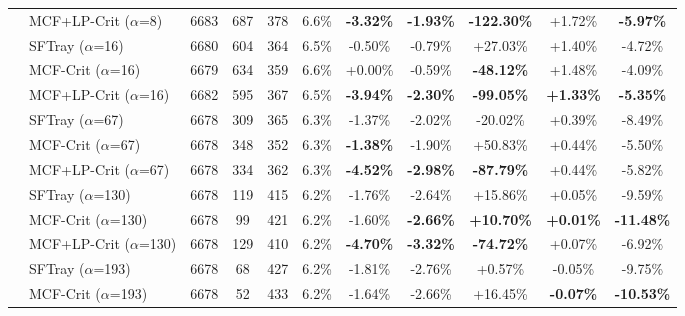 \begin{table}[t]
{\begin{tabular}{ll|cccc|ccc|cc}
 & MCF+LP-Crit ($\alpha$=8) & 6683 & 687 & 378 & 6.6\% & \textbf{-3.32\%} & \textbf{-1.93\%} & \textbf{-122.30\%} & +1.72\% & \textbf{-5.97\%} \\

\addlinespace[0.5em]

 & SFTray ($\alpha$=16) & 6680 & 604 & 364 & 6.5\% & -0.50\% & -0.79\% & +27.03\% & +1.40\% & -4.72\% \\

 & MCF-Crit ($\alpha$=16) & 6679 & 634 & 359 & 6.6\% & +0.00\% & -0.59\% & \textbf{-48.12\%} & +1.48\% & -4.09\% \\

 & MCF+LP-Crit ($\alpha$=16) & 6682 & 595 & 367 & 6.5\% & \textbf{-3.94\%} & \textbf{-2.30\%} & \textbf{-99.05\%} & \textbf{+1.33\%} & \textbf{-5.35\%} \\

\addlinespace[0.5em]

 & SFTray ($\alpha$=67) & 6678 & 309 & 365 & 6.3\% & -1.37\% & -2.02\% & -20.02\% & +0.39\% & -8.49\% \\

 & MCF-Crit ($\alpha$=67) & 6678 & 348 & 352 & 6.3\% & \textbf{-1.38\%} & -1.90\% & +50.83\% & +0.44\% & -5.50\% \\

 & MCF+LP-Crit ($\alpha$=67) & 6678 & 334 & 362 & 6.3\% & \textbf{-4.52\%} & \textbf{-2.98\%} & \textbf{-87.79\%} & +0.44\% & -5.82\% \\

\addlinespace[0.5em]

 & SFTray ($\alpha$=130) & 6678 & 119 & 415 & 6.2\% & -1.76\% & -2.64\% & +15.86\% & +0.05\% & -9.59\% \\

 & MCF-Crit ($\alpha$=130) & 6678 & 99 & 421 & 6.2\% & -1.60\% & \textbf{-2.66\%} & \textbf{+10.70\%} & \textbf{+0.01\%} & \textbf{-11.48\%} \\

 & MCF+LP-Crit ($\alpha$=130) & 6678 & 129 & 410 & 6.2\% & \textbf{-4.70\%} & \textbf{-3.32\%} & \textbf{-74.72\%} & +0.07\% & -6.92\% \\

\addlinespace[0.5em]

 & SFTray ($\alpha$=193) & 6678 & 68 & 427 & 6.2\% & -1.81\% & -2.76\% & +0.57\% & -0.05\% & -9.75\% \\

 & MCF-Crit ($\alpha$=193) & 6678 & 52 & 433 & 6.2\% & -1.64\% & -2.66\% & +16.45\% & \textbf{-0.07\%} & \textbf{-10.53\%} \\


\end{tabular}}
\end{table}
